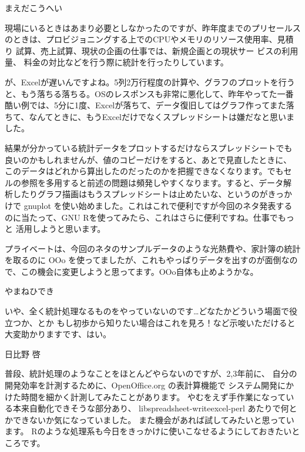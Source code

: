\begin{prework}{まえだこうへい}

 現場にいるときはあまり必要としなかったのですが、昨年度までのプリセールス
 のときは、プロビジョニングする上でのCPUやメモリのリソース使用率、見積り
 試算、売上試算、現状の企画の仕事では、新規企画との現状サー ビスの利用量、
 料金の対比などを行う際に統計を行ったりしています。

 が、Excelが遅いんですよね。5列2万行程度の計算や、グラフのプロットを行う
 と、もう落ちる落ちる。OSのレスポンスも非常に悪化して、昨年やってた一番
 酷い例では、5分に1度、Excelが落ちて、データ復旧してはグラフ作ってまた落
 ちて、なんてときに、もうExcelだけでなくスプレッドシートは嫌だなと思いま
 した。

 結果が分かっている統計データをプロットするだけならスプレッドシートでも
 良いのかもしれませんが、値のコピーだけをすると、あとで見直したときに、
 このデータはどれから算出したのだったのかを把握できなくなります。でもセ
 ルの参照を多用すると前述の問題は頻発しやすくなります。すると、データ解
 析したりグラフ描画はもうスプレッドシートは止めたいな、というのがきっか
 けで gnuplot を使い始めました。これはこれで便利ですが今回のネタ発表する
 のに当たって、GNU Rを使ってみたら、これはさらに便利ですね。仕事でもっと
 活用しようと思います。


 プライベートは、今回のネタのサンプルデータのような光熱費や、家計簿の統計
 を取るのに OOo を使ってましたが、これもやっぱりデータを出すのが面倒なの
 で、この機会に変更しようと思ってます。OOo自体も止めようかな。
\end{prework}


\begin{prework}{やまねひでき}

いや、全く統計処理なるものをやっていないのです…どなたかどういう場面で役立つか、とか
もし初歩から知りたい場合はこれを見ろ！など示唆いただけると大変助かりますです、はい。

\end{prework}

\begin{prework}{日比野 啓}

 普段、統計処理のようなことをほとんどやらないのですが、2,3年前に、
 自分の開発効率を計測するために、OpenOffice.org の表計算機能で
 システム開発にかけた時間を細かく計測してみたことがあります。
 やむをえず手作業になっている本来自動化できそうな部分あり、
 libspreadsheet-writeexcel-perl あたりで何とかできないか気になっていました。
 また機会があれば試してみたいと思っています。
 Rのような処理系も今日をきっかけに使いこなせるようにしておきたいところです。

\end{prework}

